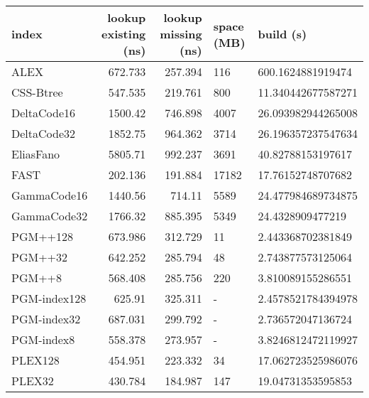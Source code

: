 \begin{tabular}{lrrll}
\hline
 index             &   lookup existing (ns) &   lookup missing (ns) & space (MB)   & build (s)             \\
\hline
 ALEX              &                672.733 &               257.394 & 116          & 600.1624881919474     \\
 CSS-Btree         &                547.535 &               219.761 & 800          & 11.340442677587271    \\
 DeltaCode16       &               1500.42  &               746.898 & 4007         & 26.093982944265008    \\
 DeltaCode32       &               1852.75  &               964.362 & 3714         & 26.196357237547634    \\
 EliasFano         &               5805.71  &               992.237 & 3691         & 40.82788153197617     \\
 FAST              &                202.136 &               191.884 & 17182        & 17.76152748707682     \\
 GammaCode16       &               1440.56  &               714.11  & 5589         & 24.477984689734875    \\
 GammaCode32       &               1766.32  &               885.395 & 5349         & 24.4328909477219      \\
 PGM++128          &                673.986 &               312.729 & 11           & 2.443368702381849     \\
 PGM++32           &                642.252 &               285.794 & 48           & 2.743877573125064     \\
 PGM++8            &                568.408 &               285.756 & 220          & 3.810089155286551     \\
 PGM-index128      &                625.91  &               325.311 & -            & 2.4578521784394978    \\
 PGM-index32       &                687.031 &               299.792 & -            & 2.736572047136724     \\
 PGM-index8        &                558.378 &               273.957 & -            & 3.8246812472119927    \\
 PLEX128           &                454.951 &               223.332 & 34           & 17.062723525986076    \\
 PLEX32            &                430.784 &               184.987 & 147          & 19.04731353595853     \\

\end{tabular}
